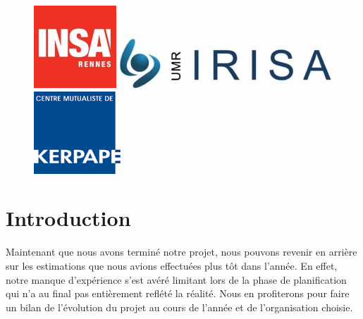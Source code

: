 \documentclass[a4paper,11pt]{article}
\begin{document}
\begin{figure}[h!]
   \begin{minipage}{0.3\linewidth}
      \includegraphics[scale=0.9]{8-BilanPlanification/img/logo_insa.jpeg}
   \end{minipage} 
   \begin{minipage}{0.2\linewidth}
      \centering
      \includegraphics[scale=0.5,left]{8-BilanPlanification/img/logo_irisa.jpg}
   \end{minipage}\hfill
   \begin{minipage}{0.2\linewidth}
      \includegraphics[scale=0.9]{8-BilanPlanification/img/logo_kerpape.png}
   \end{minipage}
\end{figure}

\pagebreak

\tableofcontents
\pagebreak

\section{Introduction}
Maintenant que nous avons terminé notre projet, nous pouvons revenir en arrière sur les estimations que nous avions effectuées plus tôt dans l'année. En effet, notre manque d'expérience s'est avéré limitant lors de la phase de planification qui n'a au final pas entièrement reflété la réalité. Nous en profiterons pour faire un bilan de l'évolution du projet au cours de l'année et de l'organisation choisie.

\pagebreak


\pagebreak

\pagebreak

\end{document}
